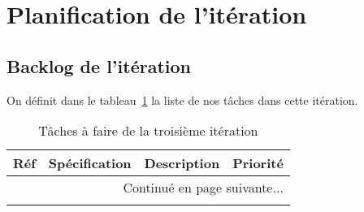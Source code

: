 \section{Planification de l'itération}

\subsection{Backlog de l'itération}

On définit dans le tableau~\ref{tab:sprint3-backlog} la liste de nos tâches
dans cette itération.

\begin{center}
    \footnotesize
    \begin{longtable}{| p{1cm} | p{5cm} | p{7cm} | p{1cm} |}
        \caption{Tâches à faire de la troisième itération}
\label{tab:sprint3-backlog} \\

 \hline
 \multicolumn{1}{|c}{\textbf{Réf}} &
 \multicolumn{1}{|c}{\textbf{Spécification}} &
 \multicolumn{1}{|c}{\textbf{Description}} &
 \multicolumn{1}{|c|}{\textbf{Priorité}} \\ \hline
 \endhead

 \hline \multicolumn{4}{|r|}{{Continué en page suivante$\dotsc$}} \\ \hline
 \endfoot

 \hline \hline
 \endlastfoot


\end{longtable}
\end{center}
